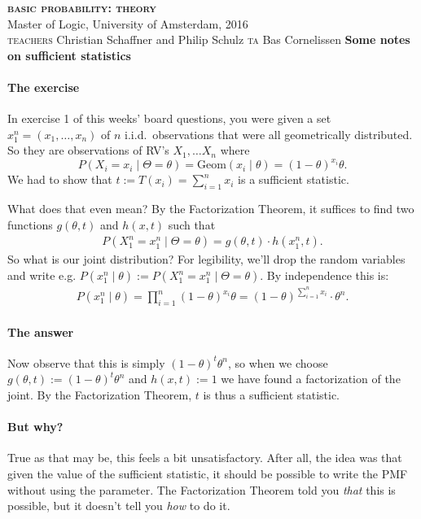\documentclass[a4paper,10pt,landscape,twocolumn]{scrartcl}
\begin{document}
	{\sffamily\flushleft\color{gray}
		\textsc{\bfseries basic probability: theory}\\
		Master of Logic, University of Amsterdam, 2016\\
		\textsc{teachers} Christian Schaffner and Philip Schulz 
		\textsc{ta} Bas Cornelissen%
	}
	{\sffamily\flushleft\huge\bfseries
		Some notes on sufficient statistics
	}\\[1em]%
	
\noindent
\paragraph{The exercise} In exercise 1 of this weeks' board questions, you were given a set $x_1^n = (x_1, \dots, x_n)$ of $n$ i.i.d.\ observations that were all geometrically distributed. So they are observations of RV's $X_1, \dots X_n$ where
	\[
		P(X_i = x_i \mid \Theta = \theta) = \text{Geom}(x_i \mid \theta) = (1-\theta)^{x_i} \theta.
	\]
	We had to show that $t := T(x_i) = \sum_{i=1}^n x_i$ is a sufficient statistic. 
	
	What does that even mean? By the Factorization Theorem, it suffices to find two functions $g(\theta, t)$ and $h(x, t)$ such that 
	\begin{align}
		P(X_1^n = x_1^n \mid \Theta = \theta) = g(\theta, t) \cdot h(x_1^n, t).
	\end{align}
	So what is our joint distribution? For legibility, we'll drop the random variables and write e.g. $P(x_1^n \mid \theta) := P(X_1^n = x_1^n \mid \Theta = \theta	)$. By independence this is:
	\begin{align}
		P(x_1^n \mid \theta) = \prod_{i=1}^n (1-\theta)^{x_i} \theta = (1-\theta)^{\sum_{i=1}^n x_i} \cdot \theta^n.
	\end{align}
	
	\paragraph{The answer}
	Now observe that this is simply $(1-\theta)^t \theta^n$, so when we choose $g(\theta, t) := (1-\theta)^t \theta^n$ and $h(x, t) := 1$ we have found a factorization of the joint. By the Factorization Theorem, $t$ is thus a sufficient statistic.
	
	\paragraph{But why?}
	True as that may be, this feels a bit unsatisfactory. After all, the idea was that given the value of the sufficient statistic, it should be possible to write the PMF without using the parameter. The Factorization Theorem told you \emph{that} this is possible, but it doesn't tell you \emph{how} to do it.
	
\end{document}
